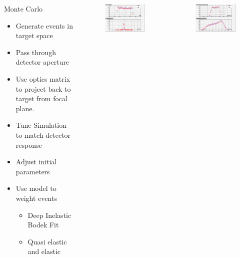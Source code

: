 \documentclass{beamer}
\begin{document}
\begin{frame}{}
\begin{columns}
		\begin{block}{Monte Carlo}
			\begin{itemize}
				\item Generate events in target space
				\item Pass through detector aperture
				\item Use optics matrix to project back to target from focal plane.
				\item Tune Simulation to match detector response
				\item Adjust initial parameters
				\item Use model to weight events
				\begin{itemize}
					\item Deep Inelastic Bodek Fit \cite{bodek}
					\item Quasi elastic  and elastic  
				\end{itemize}    
			\end{itemize}
		\end{block}
	\vspace{-20pt}
	\begin{figure}
		\includegraphics[width=6cm]{../images/dp_ytar_1207.png}
	\end{figure}
	\vspace{-30pt}
	\begin{figure}
		\includegraphics[width=6cm]{../images/xp_yp_foc_1207.png}
	\end{figure}
\end{columns}
\end{frame}
\end{document}

